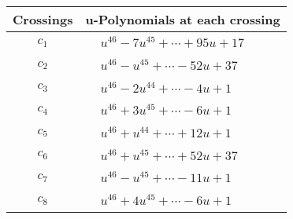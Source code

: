 \documentclass[1p]{elsarticle_modified}
\theoremstyle{definition}
\begin{document}
\begin{tabular}{m{50pt}|m{274pt}}
Crossings & \hspace{64pt}u-Polynomials at each crossing \\
\hline $$\begin{aligned}c_{1}\end{aligned}$$&$\begin{aligned}
&u^{46}-7 u^{45}+\cdots+95 u+17
\end{aligned}$\\
\hline $$\begin{aligned}c_{2}\end{aligned}$$&$\begin{aligned}
&u^{46}- u^{45}+\cdots-52 u+37
\end{aligned}$\\
\hline $$\begin{aligned}c_{3}\end{aligned}$$&$\begin{aligned}
&u^{46}-2 u^{44}+\cdots-4 u+1
\end{aligned}$\\
\hline $$\begin{aligned}c_{4}\end{aligned}$$&$\begin{aligned}
&u^{46}+3 u^{45}+\cdots-6 u+1
\end{aligned}$\\
\hline $$\begin{aligned}c_{5}\end{aligned}$$&$\begin{aligned}
&u^{46}+u^{44}+\cdots+12 u+1
\end{aligned}$\\
\hline $$\begin{aligned}c_{6}\end{aligned}$$&$\begin{aligned}
&u^{46}+u^{45}+\cdots+52 u+37
\end{aligned}$\\
\hline $$\begin{aligned}c_{7}\end{aligned}$$&$\begin{aligned}
&u^{46}- u^{45}+\cdots-11 u+1
\end{aligned}$\\
\hline $$\begin{aligned}c_{8}\end{aligned}$$&$\begin{aligned}
&u^{46}+4 u^{45}+\cdots-6 u+1
\end{aligned}$\\

\end{tabular}
\end{document}
